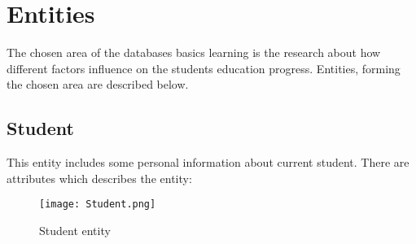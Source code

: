 \section*{Entities}

The chosen area of the databases basics learning is the research about how different factors influence on the students education progress. Entities, forming the chosen area are described below.

\subsection*{Student}

This entity includes some personal information about current student. There are attributes which describes the entity:

\begin{figure}[H]
    \centering
    \texttt{[image: Student.png]}
    \caption{Student entity}
\end{figure}

